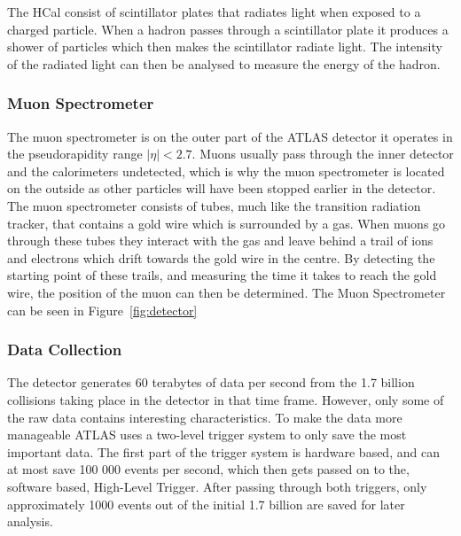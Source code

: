 \documentclass[12pt,a4paper]{article}
\numberwithin{equation}{section}
\begin{document}
The HCal consist of scintillator plates that radiates light when exposed to a
charged particle. When a hadron passes through a scintillator plate it produces
a shower of particles which then makes the scintillator radiate light. The
intensity of the radiated light can then be analysed to measure the energy of
the hadron.


\subsubsection{Muon Spectrometer}

The muon spectrometer is on the outer part of the ATLAS detector it operates in
the pseudorapidity range $|\eta| < 2.7$. Muons usually pass through the inner
detector and the calorimeters undetected, which is why the muon spectrometer is
located on the outside as other particles will have been stopped earlier in the
detector. The muon spectrometer consists of tubes, much like the transition
radiation tracker, that contains a gold wire which is surrounded by a gas. When
muons go through these tubes they interact with the gas and leave behind a trail
of ions and electrons which drift towards the gold wire in the centre. By
detecting the starting point of these trails, and measuring the time it takes to
reach the gold wire, the position of the muon can then be determined. The Muon %
Spectrometer can be seen in Figure~\ref{fig:detector}


\subsubsection{Data Collection}
The detector generates 60 terabytes of data per second from the 1.7 billion
collisions taking place in the detector in that time frame. However, only some
of the raw data contains interesting characteristics. To make the data more %
manageable ATLAS uses a two-level trigger system to only save the most important
data. The first part of the trigger system is hardware based, and can at most
save 100 000 events per second, which then gets passed on to the, software
based, High-Level Trigger. After passing through both triggers, only
approximately 1000 events out of the initial 1.7 billion are saved for later
analysis.
\end{document}
